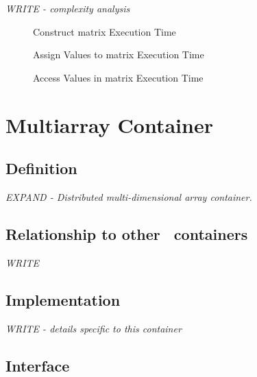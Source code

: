 \textit{WRITE - complexity analysis}

\begin{figure}[p]
\caption{Construct matrix Execution Time}
\label{fig:mat-cont-constr-exper}
\end{figure}

\begin{figure}[p]
\caption{Assign Values to matrix Execution Time}
\label{fig:mat-cont-assign-exper}
\end{figure}

\begin{figure}[p]
\caption{Access Values in matrix Execution Time}
\label{fig:mat-cont-access-exper}
\end{figure}



\section{ Multiarray Container} \label{sec-multi-cont}

\subsection{Definition}

\textit{EXPAND - Distributed multi-dimensional array container. }

\subsection{Relationship to other \stapl\ containers}

\textit{WRITE}

\subsection{Implementation}

\textit{WRITE - details specific to this container}

\subsection{Interface} \label{sec-multi-cont-inter}

